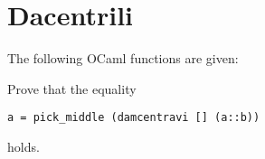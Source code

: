 \section{Dacentrili}
The following OCaml functions are given:



Prove that the equality
\begin{center}
    \begin{lstlisting}
a = pick_middle (damcentravi [] (a::b))\end{lstlisting}
\end{center}
holds.